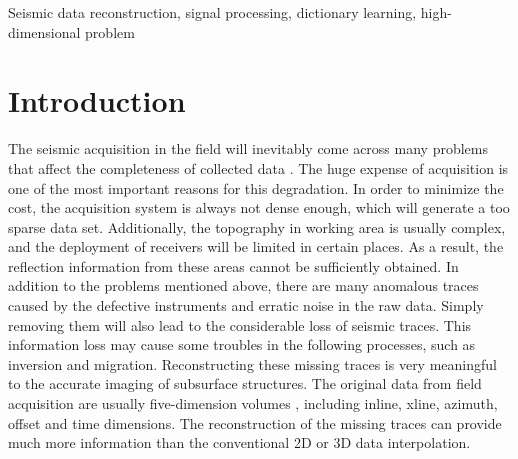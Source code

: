 \begin{keywords}
Seismic data reconstruction, signal processing, dictionary learning, high-dimensional problem
\end{keywords}

\section{Introduction}
The seismic acquisition in the field will inevitably come across many problems that affect the completeness of collected data \cite{Chao2018Adap}. The huge expense of acquisition is one of the most important reasons for this degradation. In order to minimize the cost, the acquisition system is always not dense enough, which will generate a too sparse data set. Additionally, the topography in working area is usually complex, and the deployment of receivers will be limited in certain places. As a result, the reflection information from these areas cannot be sufficiently obtained. In addition to the problems mentioned above, there are many anomalous traces caused by the defective instruments and erratic noise in the raw data. Simply removing them will also lead to the considerable loss of seismic traces. This information loss may cause some troubles in the following processes, such as inversion and migration. Reconstructing these missing traces is very meaningful to the accurate imaging of subsurface structures. The original data from field acquisition are usually five-dimension volumes \cite{yangkang2016irr5d,jianjun2017five}, including inline, xline, azimuth, offset and time dimensions. The reconstruction of the missing traces can provide much more information than the conventional 2D or 3D data interpolation. 

